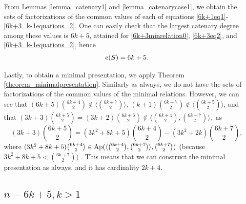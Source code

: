 \documentclass[12pt]{article}
\theoremstyle{remark}
\begin{document}
From Lemmas \ref{lemma_catenary1} and \ref{lemma_catenarycase1}, we obtain the sets of factorizations of the common values of each of equations \eqref{6k+1eq1}-\eqref{6k+3_k-1equations_2}.
One can easily check that the largest catenary degree among these values is $6k+5$, attained for \eqref{6k+3minrelation0}, \eqref{6k+3eq2}, and \eqref{6k+3_k-1equations_2}, hence
$$ \textup{c}(S) = 6k+5.$$

Lastly, to obtain a minimal presentation, we apply Theorem \ref{theorem_minimalpresentation}. Similarly as always, we do not have the sets of factorizations of the common values of the minimal relations. However, we can see that $(6k+5)\binom{6k+4}{2} \notin \langle \binom{6k+7}{2} \rangle$, $(k+1)\binom{6k+7}{2} \notin \langle \binom{6k+5}{2} \rangle$, and that 
$ (3k+3)\binom{6k+5}{2} = (3k+2) \binom{6k+6}{2} \notin \langle \binom{6k+4}{2}, \binom{6k+7}{2} \rangle, $
as 
$$(3k+3)\binom{6k+5}{2} = (3k^2 + 8k + 5)\binom{6k+4}{2} - (3k^2+2k)\binom{6k+7}{2},$$ 
where $(3k^2 + 8k + 5)\binom{6k+4}{2} \in \textup{Ap}(\langle \binom{6k+4}{2}, \binom{6k+7}{2} \rangle,\binom{6k+7}{2})$ (because $3k^2 + 8k + 5 < \binom{6k+7}{2}$) . This means that we can construct the minimal presentation as always, and it has cardinality $2k+4$.





\subsection{$n = 6k+5, k>1$}
\end{document}
